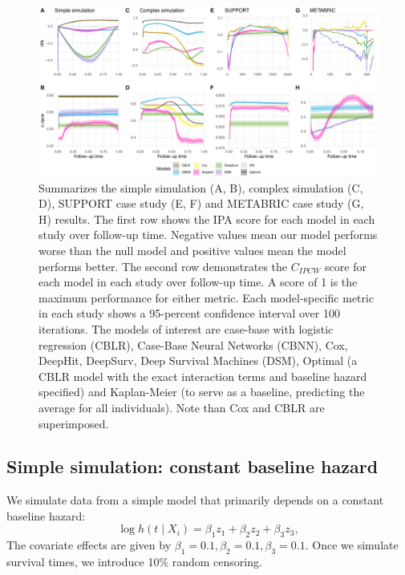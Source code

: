 \documentclass[AMA,STIX1COL,]{WileyNJD-v2}
\begin{document}
\begin{figure}

{\centering \includegraphics[width=1\linewidth]{../analyses/figures/megaPlot} 

}

\caption{Summarizes the simple simulation (A, B), complex simulation (C, D), SUPPORT case study (E, F) and METABRIC case study (G, H) results. The first row shows the IPA score for each model in each study over follow-up time. Negative values mean our model performs worse than the null model and positive values mean the model performs better. The second row demonstrates the $C_{IPCW}$ score for each model in each study over follow-up time. A score of 1 is the maximum performance for either metric. Each model-specific metric in each study shows a 95-percent confidence interval over 100 iterations. The models of interest are case-base with logistic regression (CBLR), Case-Base Neural Networks (CBNN), Cox, DeepHit, DeepSurv, Deep Survival Machines (DSM), Optimal (a CBLR model with the exact interaction terms and baseline hazard specified) and Kaplan-Meier (to serve as a baseline, predicting the average for all individuals). Note than Cox and CBLR are superimposed.}\label{fig:megaPlot}
\end{figure}

\hypertarget{simple-simulation-constant-baseline-hazard}{%
\subsection{Simple simulation: constant baseline
hazard}\label{simple-simulation-constant-baseline-hazard}}

We simulate data from a simple model that primarily depends on a
constant baseline hazard:
\[\log h(t \mid X_i) = \beta_{{1}}z_{1}+\beta_{{2}}z_{2}+\beta_{{3}}z_{3},\]
The covariate effects are given by
\(\beta_{{1}}=0.1, \beta_{{2}}=0.1, \beta_{{3}}=0.1\). Once we simulate
survival times, we introduce 10\% random censoring.
\end{document}
